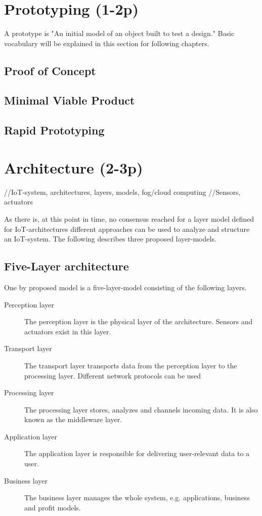 \section{Prototyping (1-2p)}
A prototype is "An initial model of an object built to test a design." \parencite{prototypeDef}
Basic vocabulary will be explained in this section for following chapters.

\subsection{Proof of Concept}
\subsection{Minimal Viable Product}
\subsection{Rapid Prototyping}


\section{Architecture (2-3p)}
//IoT-system, architectures, layers, models, fog/cloud computing //Sensors, actuators

As there is, at this point in time, no consensus reached for a
layer model defined for IoT-architectures \parencite{noModel}
different approaches can be used to analyze and structure an IoT-system. 
The following describes three proposed layer-models.

\subsection{Five-Layer architecture}
One by \parencite{fivelayer1,fivelayer2} proposed model is a five-layer-model consisting of the following layers.
\begin{description}
    \item [Perception layer]
    The perception layer is the physical layer of the architecture. Sensors and actuators exist in this layer.
    \item [Transport layer]
     The transport layer transports data from the perception layer to the processing layer. Different network protocols can be used
   \item [Processing layer]
   The processing layer stores, analyzes and channels incoming data. It is also known as the middleware layer.
   \item [Application layer]
   The application layer is responsible for delivering user-relevant data to a user.
   \item [Business layer]
   The business layer manages the whole system, e.g. applications, business and profit models.
\end{description}

